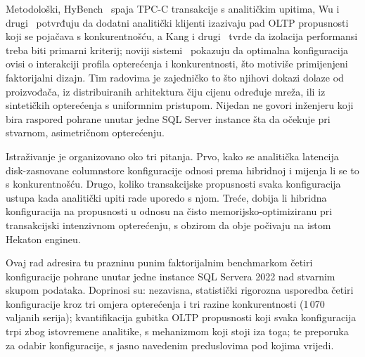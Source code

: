 \documentclass[10pt,conference,a4paper]{IEEEtran}
\begin{document}
Metodološki, HyBench~\cite{zhang2024hybench} spaja TPC-C transakcije s
analitičkim upitima, Wu i drugi~\cite{wu2025} potvrđuju da dodatni
analitički klijenti izazivaju pad OLTP propusnosti koji se pojačava s
konkurentnošću, a Kang i drugi~\cite{kang2023} tvrde da izolacija
performansi treba biti primarni kriterij; noviji
sistemi~\cite{zhao2025pushtap, zhang2025synchro, chen2025vedb} pokazuju da
optimalna konfiguracija ovisi o interakciji profila opterećenja i
konkurentnosti, što motiviše primijenjeni faktorijalni dizajn.
Tim radovima je zajedničko to što njihovi dokazi dolaze od proizvođača, iz
distribuiranih arhitektura čiju cijenu određuje mreža, ili iz sintetičkih
opterećenja s uniformnim pristupom. Nijedan ne govori inženjeru koji bira
raspored pohrane unutar jedne SQL Server instance šta da očekuje pri
stvarnom, asimetričnom opterećenju.

Istraživanje je organizovano oko tri pitanja. Prvo, kako se analitička
latencija disk-zasnovane columnstore konfiguracije odnosi prema hibridnoj i
mijenja li se to s konkurentnošću. Drugo, koliko transakcijske propusnosti
svaka konfiguracija ustupa kada analitički upiti rade uporedo s njom. Treće,
dobija li hibridna konfiguracija na propusnosti u odnosu na čisto
memorijsko-optimiziranu pri transakcijski intenzivnom opterećenju, s obzirom
da obje počivaju na istom Hekaton engineu.

Ovaj rad adresira tu prazninu punim faktorijalnim benchmarkom četiri
konfiguracije pohrane unutar jedne instance SQL Servera 2022 nad stvarnim
skupom podataka. Doprinosi su: nezavisna, statistički rigorozna usporedba
četiri konfiguracije kroz tri omjera opterećenja i tri razine konkurentnosti
(1\,070 valjanih serija); kvantifikacija gubitka OLTP propusnosti koji svaka
konfiguracija trpi zbog istovremene analitike, s mehanizmom koji stoji iza
toga; te preporuka za odabir konfiguracije, s jasno navedenim
preduslovima pod kojima vrijedi.


\end{document}
